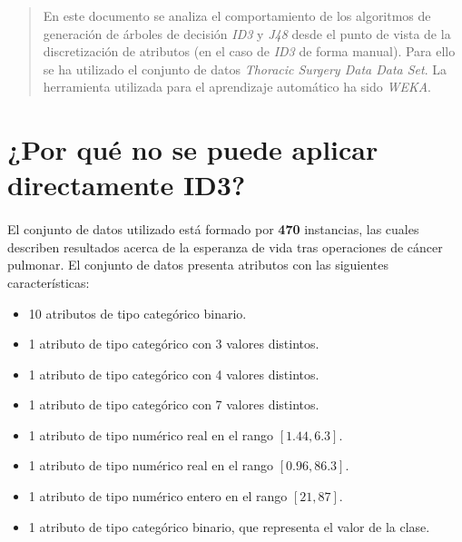 \documentclass[10pt, a4paper,spanish]{article}
\begin{document}
	\maketitle %

	\thispagestyle{fancy} %



	\begin{abstract}
		\noindent En este documento se analiza el comportamiento de los algoritmos de generación de árboles de decisión \emph{ID3} y \emph{J48} desde el punto de vista de la discretización de atributos (en el caso de \emph{ID3} de forma manual). Para ello se ha utilizado el conjunto de datos \emph{Thoracic Surgery Data Data Set}\cite{dataset:thoracic}. La herramienta utilizada para el aprendizaje automático ha sido \emph{WEKA}\cite{tool:weka}.
	\end{abstract}



	\section{¿Por qué no se puede aplicar directamente ID3?}

		\paragraph{}
		El conjunto de datos utilizado\cite{dataset:thoracic} está formado por \textbf{470} instancias, las cuales describen resultados acerca de la esperanza de vida tras operaciones de cáncer pulmonar. El conjunto de datos presenta atributos con las siguientes características:
		\begin{itemize}
			\setlength\itemsep{0em}
			\item 10 atributos de tipo categórico binario.
			\item 1 atributo de tipo categórico con 3 valores distintos.
			\item 1 atributo de tipo categórico con 4 valores distintos.
			\item 1 atributo de tipo categórico con 7 valores distintos.
			\item 1 atributo de tipo numérico real en el rango $[1.44, 6.3]$.
			\item 1 atributo de tipo numérico real en el rango $[0.96, 86.3]$.
			\item 1 atributo de tipo numérico entero en el rango $[21, 87]$.
			\item 1 atributo de tipo categórico binario, que representa el valor de la clase.
		\end{itemize}
\end{document}
